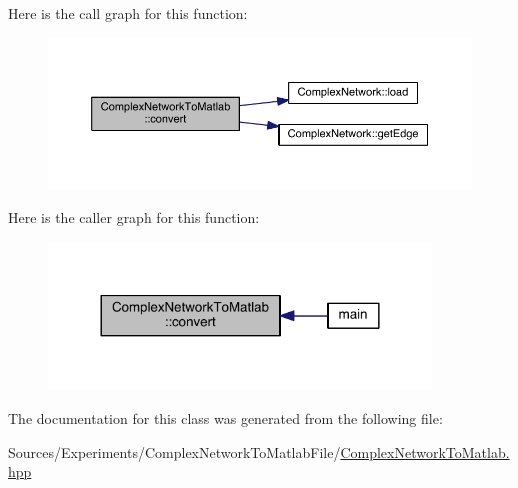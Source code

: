 Here is the call graph for this function\+:\nopagebreak
\begin{figure}[H]
\begin{center}
\leavevmode
\includegraphics[width=350pt]{class_complex_network_to_matlab_a8d0d921690e8d376364c733c45c0f777_cgraph}
\end{center}
\end{figure}




Here is the caller graph for this function\+:\nopagebreak
\begin{figure}[H]
\begin{center}
\leavevmode
\includegraphics[width=288pt]{class_complex_network_to_matlab_a8d0d921690e8d376364c733c45c0f777_icgraph}
\end{center}
\end{figure}




The documentation for this class was generated from the following file\+:\begin{DoxyCompactItemize}
\item 
Sources/\+Experiments/\+Complex\+Network\+To\+Matlab\+File/\hyperlink{_complex_network_to_matlab_8hpp}{Complex\+Network\+To\+Matlab.\+hpp}\end{DoxyCompactItemize}
